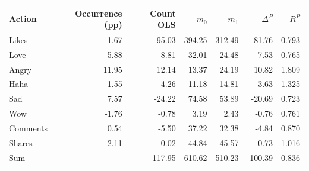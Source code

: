 \begin{tabular}{lrrrrrr}
\toprule
Action & Occurrence (pp) & Count OLS & $m_0$ & $m_1$ & $\Delta^{P}$ & $R^{P}$ \\
\midrule
Likes & -1.67 & -95.03 & 394.25 & 312.49 & -81.76 & 0.793 \\
Love & -5.88 & -8.81 & 32.01 & 24.48 & -7.53 & 0.765 \\
Angry & 11.95 & 12.14 & 13.37 & 24.19 & 10.82 & 1.809 \\
Haha & -1.55 & 4.26 & 11.18 & 14.81 & 3.63 & 1.325 \\
Sad & 7.57 & -24.22 & 74.58 & 53.89 & -20.69 & 0.723 \\
Wow & -1.76 & -0.78 & 3.19 & 2.43 & -0.76 & 0.761 \\
Comments & 0.54 & -5.50 & 37.22 & 32.38 & -4.84 & 0.870 \\
Shares & 2.11 & -0.02 & 44.84 & 45.57 & 0.73 & 1.016 \\
Sum & --- & -117.95 & 610.62 & 510.23 & -100.39 & 0.836 \\
\bottomrule
\end{tabular}
